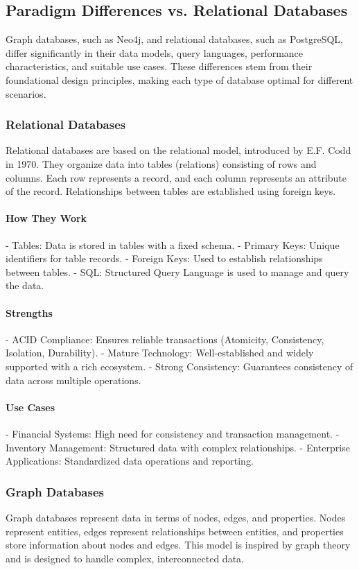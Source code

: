 \subsection{Paradigm Differences vs. Relational Databases}
Graph databases, such as Neo4j, and relational databases, such as PostgreSQL, differ significantly in their data models, query languages, performance characteristics, and suitable use cases. These differences stem from their foundational design principles, making each type of database optimal for different scenarios.

\subsubsection{Relational Databases}
Relational databases are based on the relational model, introduced by E.F. Codd in 1970. They organize data into tables (relations) consisting of rows and columns. Each row represents a record, and each column represents an attribute of the record. Relationships between tables are established using foreign keys.

\paragraph{How They Work}
- Tables: Data is stored in tables with a fixed schema.
- Primary Keys: Unique identifiers for table records.
- Foreign Keys: Used to establish relationships between tables.
- SQL: Structured Query Language is used to manage and query the data.

\paragraph{Strengths}
- ACID Compliance: Ensures reliable transactions (Atomicity, Consistency, Isolation, Durability).
- Mature Technology: Well-established and widely supported with a rich ecosystem.
- Strong Consistency: Guarantees consistency of data across multiple operations.

\paragraph{Use Cases}
- Financial Systems: High need for consistency and transaction management.
- Inventory Management: Structured data with complex relationships.
- Enterprise Applications: Standardized data operations and reporting.

\subsubsection{Graph Databases}
Graph databases represent data in terms of nodes, edges, and properties. Nodes represent entities, edges represent relationships between entities, and properties store information about nodes and edges. This model is inspired by graph theory and is designed to handle complex, interconnected data.

